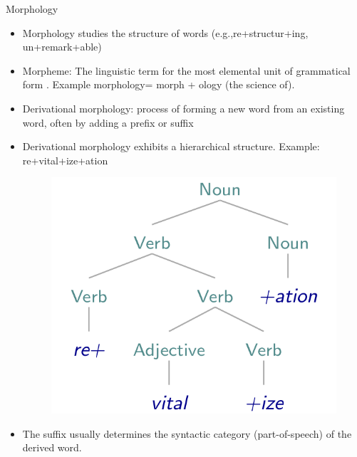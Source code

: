 \documentclass[handout]{beamer}
\begin{document}
\begin{frame}{Morphology}
\scriptsize{


\begin{itemize}
\item Morphology studies the structure of words (e.g.,re+structur+ing, un+remark+able) \cite{JohnsonMLSS}  
\item Morpheme: The linguistic term for the most elemental unit of grammatical form \cite{fromkin2018introduction}. Example morphology= morph + ology (the science of).
\item Derivational morphology: process of forming a new word from an existing word, often by adding a prefix or suffix 
\item Derivational morphology exhibits a hierarchical structure. Example: re+vital+ize+ation
     \begin{figure}[h]
        	\includegraphics[scale = 0.2]{pics/morphology.png}
        \end{figure}
\item The suffix usually determines the syntactic category (part-of-speech) of the derived word.        
\end{itemize}

}


\end{frame}
\end{document}
